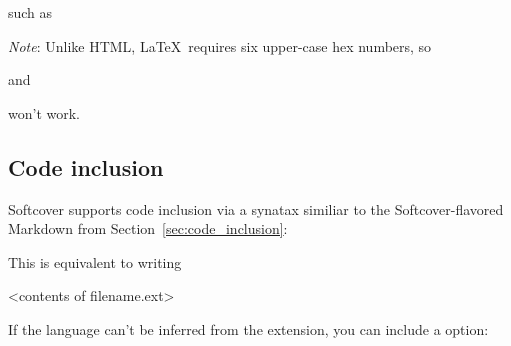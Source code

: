 \begin{code}
 such as
\end{code}

\noindent \emph{Note}: Unlike HTML, \LaTeX\ requires six upper-case hex numbers, so

\begin{code}
\end{code}

\noindent and

\begin{code}
\end{code}

\noindent won't work.


\subsection{Code inclusion} %
\label{sec:polyex_code_inclusion}

Softcover supports code inclusion via a synatax similiar to the Softcover-flavored Markdown from Section~\ref{sec:code_inclusion}:

\begin{code}
\end{code}

\noindent This is equivalent to writing

\begin{code}
\begin{code}
<contents of filename.ext>
\end{code}
\end{code}

\noindent If the language can't be inferred from the extension, you can include a  option:


\begin{code}
\end{code}





